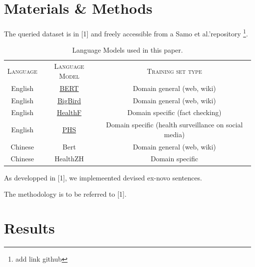 \documentclass{IOS-Book-Article}
\begin{document}
\section{Materials \& Methods}

The queried dataset is in [1] and freely accessible from a Samo et al.'repository \footnote{add link github}. 

\begin{table}[]
    \centering
    \begin{tabular}{c|c|c}
         \textsc{Language} & \textsc{Language Model} & \textsc{Training set type}\\
         English & \href{https://huggingface.co/docs/transformers/model_doc/bert}{\underline{BERT}} & Domain general (web, wiki)\\
         English & \href{https://huggingface.co/docs/transformers/model_doc/big_bird}{\underline{BigBird}} & Domain general (web, wiki)\\
         English & \href{https://huggingface.co/austinmw/distilbert-base-uncased-finetuned-health_facts}{\underline{HealthF}} & Domain specific (fact checking)\\
         English & \href{https://huggingface.co/publichealthsurveillance/PHS-BERT}{\underline{PHS}} & Domain specific (health surveillance on social media)\\
         Chinese & Bert & Domain general (web, wiki)\\
         Chinese & HealthZH & Domain specific\\
         
    \end{tabular}
    \caption{Language Models used in this paper.}
    \label{tab:my_label}
\end{table}

As developped in [1], we implemeented devised ex-novo sentences. 

The methodology is to be referred to [1].

\section{Results}
\end{document}
